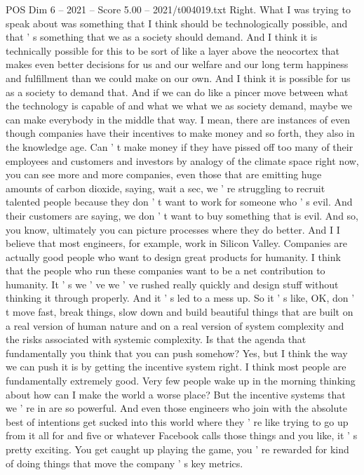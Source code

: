 \begin{textsample}{POS Dim 6 – 2021 – Score 5.00 – 2021/t004019.txt}
Right.
What I was trying to speak about was something that I think should be technologically possible, and that ' s something that we as a society should demand.
And I think it is technically possible for this to be sort of like a layer above the neocortex that makes even better decisions for us and our welfare and our long term happiness and fulfillment than we could make on our own.
And I think it is possible for us as a society to demand that.
And if we can do like a pincer move between what the technology is capable of and what we what we as society demand, maybe we can make everybody in the middle that way.
I mean, there are instances of even though companies have their incentives to make money and so forth, they also in the knowledge age.
Can ' t make money if they have pissed off too many of their employees and customers and investors by analogy of the climate space right now, you can see more and more companies, even those that are emitting huge amounts of carbon dioxide, saying, wait a sec, we ' re struggling to recruit talented people because they don ' t want to work for someone who ' s evil.
And their customers are saying, we don ' t want to buy something that is evil.
And so, you know, ultimately you can picture processes where they do better.
And I I believe that most engineers, for example, work in Silicon Valley.
Companies are actually good people who want to design great products for humanity.
I think that the people who run these companies want to be a net contribution to humanity.
It ' s we ' ve we ' ve rushed really quickly and design stuff without thinking it through properly.
And it ' s led to a mess up.
So it ' s like, OK, don ' t move fast, break things, slow down and build beautiful things that are built on a real version of human nature and on a real version of system complexity and the risks associated with systemic complexity.
Is that the agenda that fundamentally you think that you can push somehow?
Yes, but I think the way we can push it is by getting the incentive system right.
I think most people are fundamentally extremely good.
Very few people wake up in the morning thinking about how can I make the world a worse place?
But the incentive systems that we ' re in are so powerful.
And even those engineers who join with the absolute best of intentions get sucked into this world where they ' re like trying to go up from it all for and five or whatever Facebook calls those things and you like, it ' s pretty exciting.
You get caught up playing the game, you ' re rewarded for kind of doing things that move the company ' s key metrics.

\end{textsample}
